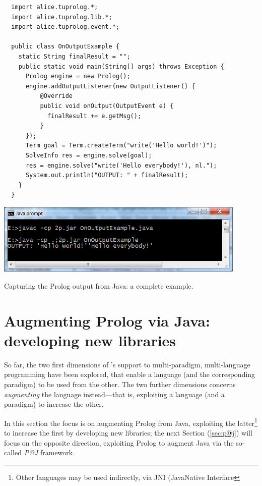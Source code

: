 \begin{table}[h]
{\small
\begin{verbatim}
  import alice.tuprolog.*;
  import alice.tuprolog.lib.*;
  import alice.tuprolog.event.*;

  public class OnOutputExample {
    static String finalResult = "";
    public static void main(String[] args) throws Exception {
      Prolog engine = new Prolog();
      engine.addOutputListener(new OutputListener() {
          @Override
          public void onOutput(OutputEvent e) {
            finalResult += e.getMsg();
          }
      });
      Term goal = Term.createTerm("write('Hello world!')");
      SolveInfo res = engine.solve(goal);
      res = engine.solve("write('Hello everybody!'), nl.");
      System.out.println("OUTPUT: " + finalResult);
    }
  }
\end{verbatim}}
  \includegraphics[width=12cm]{images/onOutput}
\caption{Capturing the Prolog output from Java: a complete example.}
\label{tab:capturing-output-complete}
\end{table}

\section{Augmenting Prolog via Java:\\developing new libraries}
\label{sec:howto-develop-libraries}

So far, the two first dimensions of \tuprolog{}'s support to multi-paradigm, multi-language programming have been explored, that enable a language (and the corresponding paradigm) to be used from the other.
The two further dimensions concerns \textit{augmenting} the language instead---that is, exploiting a language (and a paradigm) to increase the other.

In this section the focus is on augmenting Prolog from Java, exploiting the latter\footnote{%
 Other languages may be used indirectly, via JNI (JavaNative Interface}
to increase the first by developing new \tuprolog{} libraries; the next Section (\ref{sec:p@j}) will focus on the opposite direction, exploiting Prolog to augment Java via the so-called \textit{P@J} framework.

